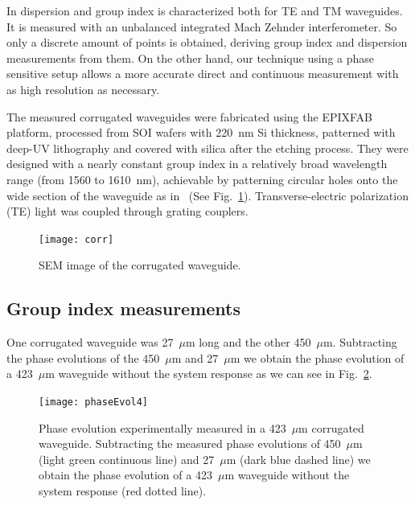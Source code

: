 \documentclass[journal]{IEEEtran}
\begin{document}
In \cite{Dulkeith2006} dispersion and group index is characterized both for TE and TM waveguides. It is measured with an unbalanced integrated Mach Zehnder interferometer. So only a discrete amount of points is obtained, deriving group index and dispersion measurements from them. On the other hand, our technique using a phase sensitive setup allows a more accurate direct and continuous measurement with as high resolution as necessary.

The measured corrugated waveguides were fabricated using the EPIXFAB platform, processed from SOI wafers with 220~nm Si thickness, patterned with deep-UV lithography and covered with silica after the etching process. They were designed with a nearly constant group index in a relatively broad wavelength range (from 1560 to 1610~nm), achievable by patterning circular holes onto the wide section of the waveguide as in~\cite{Brimont2010} (See Fig.~\ref{fig:sem}). Transverse-electric polarization (TE) light was coupled through grating couplers.

\begin{figure}[htb]
	\centering
	\texttt{[image: corr]}	
	\caption{SEM image of the corrugated waveguide.}
	\label{fig:sem}
\end{figure}


\subsection{Group index measurements}
One corrugated waveguide was 27~$\mu$m long and the other 450~$\mu$m. Subtracting the phase evolutions of the 450~$\mu$m and 27~$\mu$m we obtain the phase evolution of a 423~$\mu$m waveguide without the system response as we can see in Fig.~\ref{fig:phaseEvolution}.


\begin{figure}[htb]
    \centering
    \texttt{[image: phaseEvol4]}
    \caption{Phase evolution experimentally measured in a 423~$\mu$m corrugated waveguide. Subtracting the measured phase evolutions of 450~$\mu$m (light green continuous line) and 27~$\mu$m (dark blue dashed line) we obtain the phase evolution of a 423~$\mu$m waveguide without the system response (red dotted line).}
    \label{fig:phaseEvolution}
\end{figure}
\end{document}
